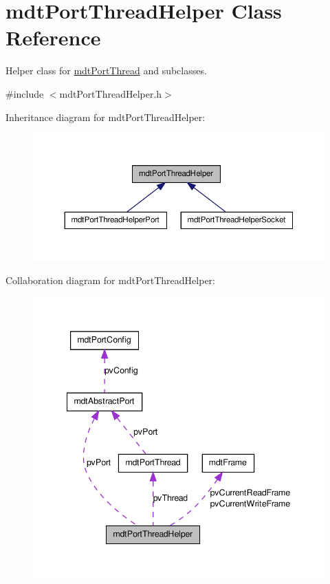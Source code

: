 \hypertarget{classmdt_port_thread_helper}{
\section{mdtPortThreadHelper Class Reference}
\label{classmdt_port_thread_helper}
}


Helper class for \hyperlink{classmdt_port_thread}{mdtPortThread} and subclasses.  




{\ttfamily \#include $<$mdtPortThreadHelper.h$>$}



Inheritance diagram for mdtPortThreadHelper:
\nopagebreak
\begin{figure}[H]
\begin{center}
\leavevmode
\includegraphics[width=366pt]{classmdt_port_thread_helper__inherit__graph}
\end{center}
\end{figure}


Collaboration diagram for mdtPortThreadHelper:
\nopagebreak
\begin{figure}[H]
\begin{center}
\leavevmode
\includegraphics[width=342pt]{classmdt_port_thread_helper__coll__graph}
\end{center}
\end{figure}

